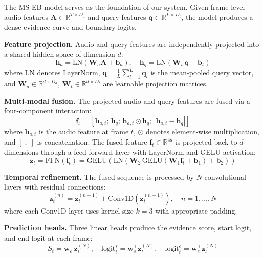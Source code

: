 \documentclass[conference]{IEEEtran}
\begin{document}
The MS-EB model serves as the foundation of our system.  Given frame-level
audio features \(\mathbf{A} \in \mathbb{R}^{T \times D_a}\) and query features
\(\mathbf{q} \in \mathbb{R}^{L \times D_t}\), the model produces a dense evidence
curve and boundary logits.

\textbf{Feature projection.}  Audio and query features are independently
projected into a shared hidden space of dimension \(d\):
\begin{equation}
\label{eq:proj}
\mathbf{h}_a = \text{LN}(\mathbf{W}_a \mathbf{A} + \mathbf{b}_a), \quad
\mathbf{h}_q = \text{LN}(\mathbf{W}_t \, \bar{\mathbf{q}} + \mathbf{b}_t)
\end{equation}
where \(\text{LN}\) denotes LayerNorm, \(\bar{\mathbf{q}} =
\frac{1}{L}\sum_{l=1}^{L} \mathbf{q}_l\) is the mean-pooled query vector, and
\(\mathbf{W}_a \in \mathbb{R}^{d \times D_a}\), \(\mathbf{W}_t \in \mathbb{R}^{d
\times D_t}\) are learnable projection matrices.

\textbf{Multi-modal fusion.}  The projected audio and query features are fused
via a four-component interaction:
\begin{equation}
\label{eq:fusion}
\mathbf{f}_t = [\mathbf{h}_{a,t}; \, \mathbf{h}_q; \, \mathbf{h}_{a,t}
\odot \mathbf{h}_q; \, |\mathbf{h}_{a,t} - \mathbf{h}_q|]
\end{equation}
where \(\mathbf{h}_{a,t}\) is the audio feature at frame \(t\), \(\odot\) denotes
element-wise multiplication, and \([\cdot;\cdot]\) is concatenation.  The fused
feature \(\mathbf{f}_t \in \mathbb{R}^{4d}\) is projected back to \(d\) dimensions
through a feed-forward layer with LayerNorm and GELU activation:
\begin{equation}
\label{eq:ffn}
\mathbf{z}_t = \text{FFN}(\mathbf{f}_t) = \text{GELU}(\text{LN}(\mathbf{W}_2
\, \text{GELU}(\mathbf{W}_1 \mathbf{f}_t + \mathbf{b}_1) + \mathbf{b}_2))
\end{equation}

\textbf{Temporal refinement.}  The fused sequence is processed by \(N\)
convolutional layers with residual connections:
\begin{equation}
\label{eq:temporal}
\mathbf{z}_t^{(n)} = \mathbf{z}_t^{(n-1)} + \text{Conv1D}(\mathbf{z}_t^{(n-1)}),
\quad n = 1, \ldots, N
\end{equation}
where each Conv1D layer uses kernel size \(k=3\) with appropriate padding.

\textbf{Prediction heads.}  Three linear heads produce the evidence score,
start logit, and end logit at each frame:
\begin{equation}
\label{eq:heads}
S_t = \mathbf{w}_e^\top \mathbf{z}_t^{(N)}, \quad
\text{logit}_t^s = \mathbf{w}_s^\top \mathbf{z}_t^{(N)}, \quad
\text{logit}_t^e = \mathbf{w}_e^\top \mathbf{z}_t^{(N)}
\end{equation}
\end{document}
